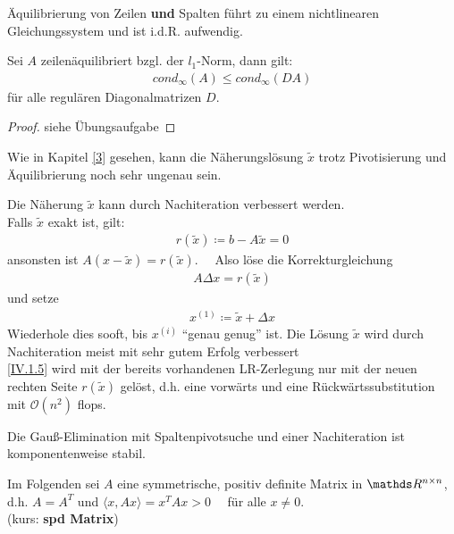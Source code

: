 Äquilibrierung von Zeilen \textbf{und} Spalten führt zu einem nichtlinearen Gleichungssystem und ist i.d.R. aufwendig.


\begin{Leme}
  \label{4.3.1}
  Sei $A$ zeilenäquilibriert bzgl. der $l_1$-Norm, dann gilt:
  \begin{gather}
    cond_{\infty}(A) \leq cond_{\infty}(DA)  \label{IV.1.3}
  \end{gather}
  für alle regulären Diagonalmatrizen $D$.
\end{Leme} 

\begin{proof}
  siehe Übungsaufgabe
\end{proof}

Wie in Kapitel \ref{3} gesehen, kann die Näherungslösung $\widetilde{x}$ 
trotz Pivotisierung und Äquilibrierung noch sehr ungenau sein.


 
Die Näherung $\widetilde{x}$ kann durch Nachiteration verbessert werden. \\
Falls $\widetilde{x}$ exakt ist, gilt:
\begin{gather}
  r(\widetilde{x}) \coloneqq b-A\widetilde{x} =0 \label{IV.1.4}
\end{gather}
ansonsten ist $A(x-\widetilde{x})=r(\widetilde{x}).$ \ \
Also löse die Korrekturgleichung
\begin{gather}
  A\Delta x = r(\widetilde{x}) 	\label{IV.1.5}
\end{gather}
und setze
\begin{gather*}
  x^{(1)} \coloneqq \widetilde{x} +\Delta x
\end{gather*}
Wiederhole dies sooft, bis $x^{(i)}$ \enquote{genau genug} ist.
Die Lösung $\widetilde{x}$ wird durch Nachiteration meist mit sehr gutem Erfolg verbessert
\cite[genaueres in ][]{dahmenreusken}\\
\eqref{IV.1.5} wird mit der bereits vorhandenen LR-Zerlegung
nur mit der neuen rechten Seite $r(\widetilde{x})$ gelöst, 
d.h. eine vorwärts und eine Rückwärtssubstitution
mit $\mathcal{O}(n^2)$ flops.

\begin{Beme}
  Die Gauß-Elimination mit Spaltenpivotsuche und einer Nachiteration
  ist komponentenweise stabil.
\end{Beme}


Im Folgenden sei $A$ eine symmetrische, positiv definite Matrix in $\Renn $, d.h.
$A=A^T$ und $\langle x, Ax \rangle = x^TAx > 0 \quad $ für alle $ x\neq 0$. \\
(kurs: \textbf{spd Matrix}) \index{spd Matrix}

